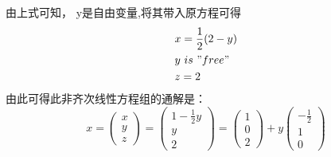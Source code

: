 \documentclass[UTF8,12pt, a4paper,fleqn]{ctexart}
\begin{document}
  由上式可知， y是自由变量,将其带入原方程可得
  \begin{equation*}
    \begin{split}
      &x =\frac{1}{2}(2-y) \\
      &y \  is \ "free" \\
      &z = 2
    \end{split}
  \end{equation*}
  由此可得此非齐次线性方程组的通解是：
  \begin{equation*}
  x=\left(\begin{array}{c}
    x \\
    y \\
    z
  \end{array}
  \right) = \left(
    \begin{array}{c}
      1-\frac{1}{2}y \\
      y \\
      2
    \end{array}
  \right)=\left(
    \begin{array}{c}
      1 \\
      0 \\
      2 
    \end{array}
  \right)
  +y\left(
    \begin{array}{c}
      -\frac{1}{2} \\
      1 \\
      0 
    \end{array}
  \right)
  \end{equation*}
\end{document}
